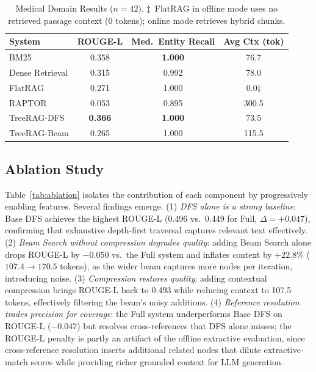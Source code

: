 \documentclass[sigconf,review,anonymous]{acmart}
\begin{document}
\begin{table}[t]
\caption{Medical Domain Results ($n=42$). $\ddagger$~FlatRAG in offline mode uses
no retrieved passage context (0 tokens); online mode retrieves hybrid chunks.}
\label{tab:medical}
\begin{tabular}{lccc}
\toprule
System & ROUGE-L & Med.\ Entity Recall & Avg Ctx (tok) \\
\midrule
BM25 & 0.358 & \textbf{1.000} & 76.7 \\
Dense Retrieval & 0.315 & 0.992 & 78.0 \\
FlatRAG & 0.271 & 1.000 & 0.0$\ddagger$ \\
RAPTOR & 0.053 & 0.895 & 300.5 \\
TreeRAG-DFS & \textbf{0.366} & \textbf{1.000} & 73.5 \\
TreeRAG-Beam & 0.265 & 1.000 & 115.5 \\
\bottomrule
\end{tabular}
\end{table}

\subsection{Ablation Study}
\label{sec:ablation}
Table~\ref{tab:ablation} isolates the contribution of each component by
progressively enabling features. Several findings emerge. (1) \emph{DFS alone is
a strong baseline}: Base DFS achieves the highest ROUGE-L (0.496 vs.\ 0.449 for
Full, $\Delta=+0.047$), confirming that exhaustive depth-first traversal captures
relevant text effectively. (2) \emph{Beam Search without compression degrades
quality}: adding Beam Search alone drops ROUGE-L by $-0.050$ vs.\ the Full system
and inflates context by $+22.8\%$ ($107.4\rightarrow170.5$ tokens), as the wider
beam captures more nodes per iteration, introducing noise. (3) \emph{Compression
restores quality}: adding contextual compression brings ROUGE-L back to 0.493
while reducing context to 107.5 tokens, effectively filtering the beam's noisy
additions. (4) \emph{Reference resolution trades precision for coverage}: the
Full system underperforms Base DFS on ROUGE-L ($-0.047$) but resolves
cross-references that DFS alone misses; the ROUGE-L penalty is partly an artifact
of the offline extractive evaluation, since cross-reference resolution inserts
additional related nodes that dilute extractive-match scores while providing
richer grounded context for LLM generation.
\end{document}
